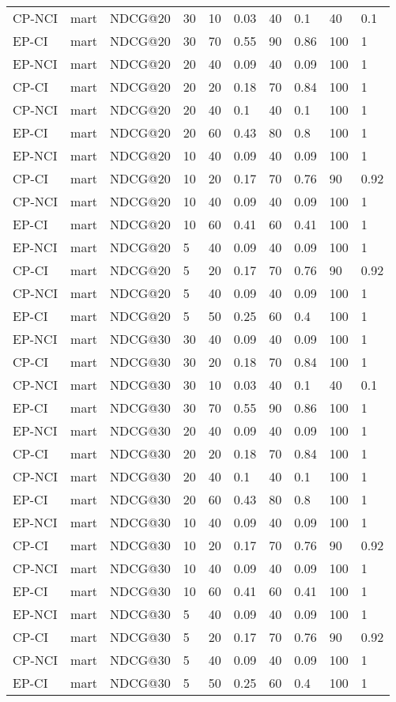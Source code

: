 \begin{landscape}
\begin{longtable}{|*{10}{l|}}
CP-NCI&mart&NDCG@20&30&10&0.03&40&0.1&40&0.1\\
EP-CI&mart&NDCG@20&30&70&0.55&90&0.86&100&1\\
\hline
EP-NCI&mart&NDCG@20&20&40&0.09&40&0.09&100&1\\
CP-CI&mart&NDCG@20&20&20&0.18&70&0.84&100&1\\
CP-NCI&mart&NDCG@20&20&40&0.1&40&0.1&100&1\\
EP-CI&mart&NDCG@20&20&60&0.43&80&0.8&100&1\\
\hline
EP-NCI&mart&NDCG@20&10&40&0.09&40&0.09&100&1\\
CP-CI&mart&NDCG@20&10&20&0.17&70&0.76&90&0.92\\
CP-NCI&mart&NDCG@20&10&40&0.09&40&0.09&100&1\\
EP-CI&mart&NDCG@20&10&60&0.41&60&0.41&100&1\\
\hline
EP-NCI&mart&NDCG@20&5&40&0.09&40&0.09&100&1\\
CP-CI&mart&NDCG@20&5&20&0.17&70&0.76&90&0.92\\
CP-NCI&mart&NDCG@20&5&40&0.09&40&0.09&100&1\\
EP-CI&mart&NDCG@20&5&50&0.25&60&0.4&100&1\\
\hline
EP-NCI&mart&NDCG@30&30&40&0.09&40&0.09&100&1\\
CP-CI&mart&NDCG@30&30&20&0.18&70&0.84&100&1\\
CP-NCI&mart&NDCG@30&30&10&0.03&40&0.1&40&0.1\\
EP-CI&mart&NDCG@30&30&70&0.55&90&0.86&100&1\\
\hline
EP-NCI&mart&NDCG@30&20&40&0.09&40&0.09&100&1\\
CP-CI&mart&NDCG@30&20&20&0.18&70&0.84&100&1\\
CP-NCI&mart&NDCG@30&20&40&0.1&40&0.1&100&1\\
EP-CI&mart&NDCG@30&20&60&0.43&80&0.8&100&1\\
\hline
EP-NCI&mart&NDCG@30&10&40&0.09&40&0.09&100&1\\
CP-CI&mart&NDCG@30&10&20&0.17&70&0.76&90&0.92\\
CP-NCI&mart&NDCG@30&10&40&0.09&40&0.09&100&1\\
EP-CI&mart&NDCG@30&10&60&0.41&60&0.41&100&1\\
\hline
EP-NCI&mart&NDCG@30&5&40&0.09&40&0.09&100&1\\
CP-CI&mart&NDCG@30&5&20&0.17&70&0.76&90&0.92\\
CP-NCI&mart&NDCG@30&5&40&0.09&40&0.09&100&1\\
EP-CI&mart&NDCG@30&5&50&0.25&60&0.4&100&1\\
\hline
\hline
\end{longtable}
\end{landscape}
